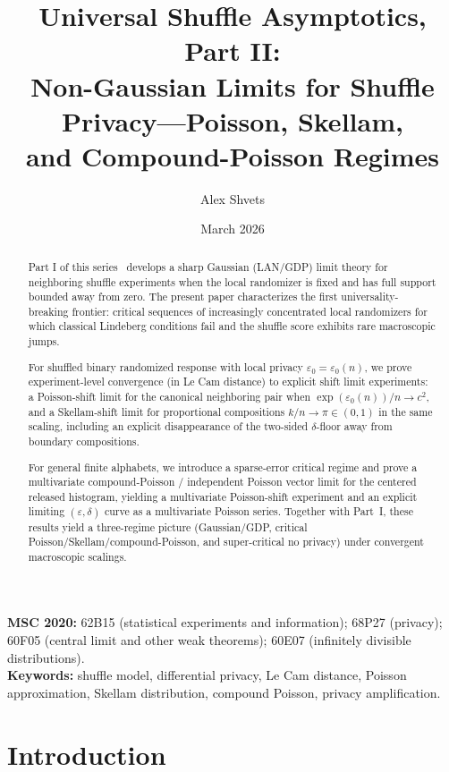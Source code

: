 \documentclass{article}
\title{Universal Shuffle Asymptotics, Part II:\\
Non-Gaussian Limits for Shuffle Privacy---Poisson, Skellam,\\
and Compound-Poisson Regimes}
\author{Alex Shvets}
\date{March 2026}
\begin{document}
\maketitle

\begin{abstract}
Part I of this series~\cite{Shv26} develops a sharp Gaussian (LAN/GDP) limit theory for neighboring
shuffle experiments when the local randomizer is fixed and has full support bounded away from
zero. The present paper characterizes the first universality-breaking frontier: critical sequences
of increasingly concentrated local randomizers for which classical Lindeberg conditions fail and
the shuffle score exhibits rare macroscopic jumps.

For shuffled binary randomized response with local privacy $\varepsilon_0 = \varepsilon_0(n)$, we prove experiment-level
convergence (in Le Cam distance) to explicit shift limit experiments: a Poisson-shift limit for
the canonical neighboring pair when $\exp(\varepsilon_0(n))/n \to c^2$, and a Skellam-shift limit for proportional
compositions $k/n \to \pi \in (0,1)$ in the same scaling, including an explicit disappearance of the
two-sided $\delta$-floor away from boundary compositions.

For general finite alphabets, we introduce a sparse-error critical regime and prove a multivariate
compound-Poisson / independent Poisson vector limit for the centered released histogram, yielding
a multivariate Poisson-shift experiment and an explicit limiting $(\varepsilon, \delta)$ curve as a multivariate
Poisson series. Together with Part~I, these results yield a three-regime picture
(Gaussian/GDP, critical Poisson/Skellam/compound-Poisson, and super-critical no privacy)
under convergent macroscopic scalings.
\end{abstract}

\noindent\textbf{MSC 2020:} 62B15 (statistical experiments and information); 68P27 (privacy); 60F05 (central limit and other weak theorems); 60E07 (infinitely divisible distributions).\\[2pt]
\noindent\textbf{Keywords:} shuffle model, differential privacy, Le Cam distance, Poisson approximation, Skellam distribution, compound Poisson, privacy amplification.

\tableofcontents

\section{Introduction}
\end{document}
